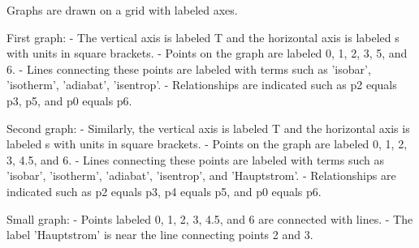 Graphs are drawn on a grid with labeled axes.

First graph:
- The vertical axis is labeled T and the horizontal axis is labeled s with units in square brackets.
- Points on the graph are labeled 0, 1, 2, 3, 5, and 6.
- Lines connecting these points are labeled with terms such as 'isobar', 'isotherm', 'adiabat', 'isentrop'.
- Relationships are indicated such as p2 equals p3, p5, and p0 equals p6.

Second graph:
- Similarly, the vertical axis is labeled T and the horizontal axis is labeled s with units in square brackets.
- Points on the graph are labeled 0, 1, 2, 3, 4.5, and 6.
- Lines connecting these points are labeled with terms such as 'isobar', 'isotherm', 'adiabat', 'isentrop', and 'Hauptstrom'.
- Relationships are indicated such as p2 equals p3, p4 equals p5, and p0 equals p6.

Small graph:
- Points labeled 0, 1, 2, 3, 4.5, and 6 are connected with lines.
- The label 'Hauptstrom' is near the line connecting points 2 and 3.